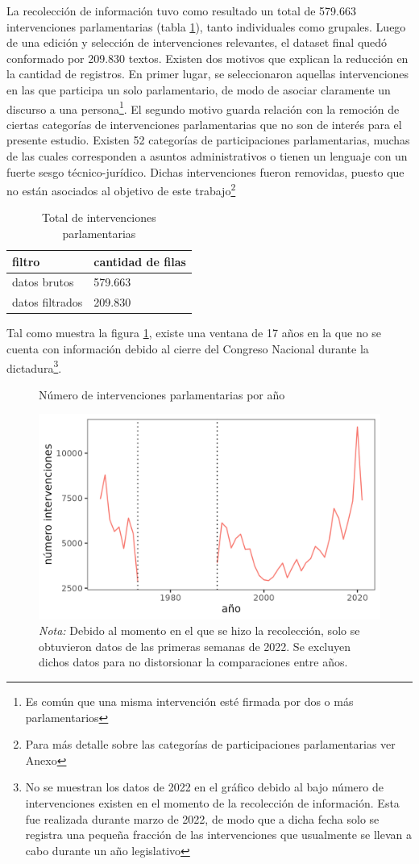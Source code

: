\documentclass[
  12pt,
]{article}
\begin{document}
La recolección de información tuvo como resultado un total de 579.663
intervenciones parlamentarias (tabla \ref{tab:tabla_pre_post_filtro}),
tanto individuales como grupales. Luego de una edición y selección de
intervenciones relevantes, el dataset final quedó conformado por 209.830
textos. Existen dos motivos que explican la reducción en la cantidad de
registros. En primer lugar, se seleccionaron aquellas intervenciones en
las que participa un solo parlamentario, de modo de asociar claramente
un discurso a una
persona\footnote{Es común que una misma intervención esté firmada por dos o más parlamentarios}.
El segundo motivo guarda relación con la remoción de ciertas categorías
de intervenciones parlamentarias que no son de interés para el presente
estudio. Existen 52 categorías de participaciones parlamentarias, muchas
de las cuales corresponden a asuntos administrativos o tienen un
lenguaje con un fuerte sesgo técnico-jurídico. Dichas intervenciones
fueron removidas, puesto que no están asociados al objetivo de este
trabajo\footnote{Para más detalle sobre las categorías de participaciones parlamentarias ver Anexo}

\begin{table}[H]

\caption{\label{tab:tabla_pre_post_filtro}Total de intervenciones parlamentarias}
\centering
\begin{tabular}[t]{ll}
\toprule
filtro & cantidad de filas\\
\midrule
datos brutos & 579.663\\
datos filtrados & 209.830\\
\bottomrule
\end{tabular}
\end{table}

Tal como muestra la figura \ref{n_year}, existe una ventana de 17 años
en la que no se cuenta con información debido al cierre del Congreso
Nacional durante la
dictadura\footnote{No se muestran los datos de 2022 en el gráfico debido al bajo número de intervenciones existen en el momento de la recolección de información. Esta fue realizada durante marzo de 2022, de modo que a dicha fecha solo se registra una pequeña fracción de las intervenciones que usualmente se llevan a cabo durante un año legislativo}.

\begin{figure}[H]
\centering
\large
\caption{Número de intervenciones parlamentarias por año}
\label{n_year}
\includegraphics[width = 0.5 \textwidth]{cuadros_tesis/plot_n_year.png}
   \caption*{\footnotesize{\textit{Nota:} Debido al momento en el que se hizo la recolección, solo se obtuvieron datos de las primeras semanas de 2022. Se excluyen dichos datos para no distorsionar la comparaciones entre años.}}
\normalsize
\end{figure}
\end{document}
